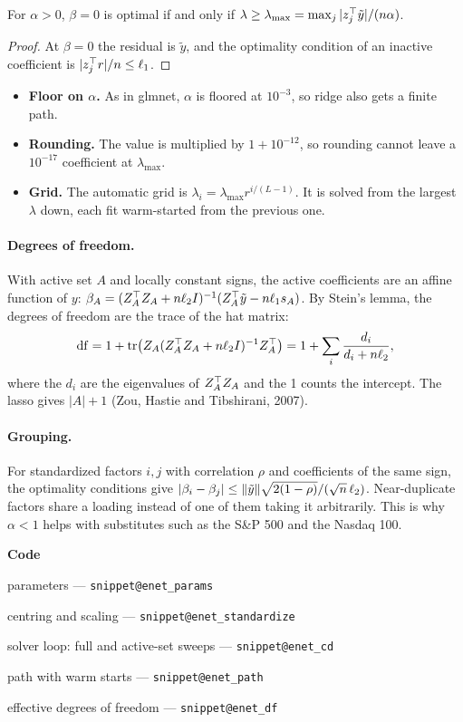 \documentclass[11pt,a4paper]{article}
\makeatletter
\newcommand{\snippetsource}[1]{\csname snippet@#1\endcsname}
\newcommand{\snippet}[3]{%
  }
\newenvironment{codepointers}{%
  \par\smallskip\begingroup\footnotesize\noindent\textcolor{blue!50!black}{\textbf{Code}}\par\nopagebreak
  \begin{list}{}{\setlength{\leftmargin}{1.2em}\setlength{\itemsep}{0pt}\setlength{\parsep}{0pt}\setlength{\topsep}{1pt}}}%
  {\end{list}\endgroup\smallskip}
\newcommand{\codeitem}[2]{\item #2 --- \texttt{\snippetsource{#1}}}
\makeatother
\begin{document}
\begin{proposition}[$\lambda_{\max}$]
For $\alpha>0$, $\beta=0$ is optimal if and only if
$\lambda\ge\lambda_{\max}=\max_j|z_j^\top\tilde y|/(n\alpha)$.
\end{proposition}
\begin{proof}
At $\beta=0$ the residual is $\tilde y$, and the optimality condition of an inactive
coefficient is $|z_j^\top r|/n\le\ell_1$.
\end{proof}
\begin{itemize}
  \item \textbf{Floor on $\alpha$.} As in glmnet, $\alpha$ is floored at $10^{-3}$, so ridge
        also gets a finite path.
  \item \textbf{Rounding.} The value is multiplied by $1+10^{-12}$, so rounding cannot
        leave a $10^{-17}$ coefficient at $\lambda_{\max}$.
  \item \textbf{Grid.} The automatic grid is $\lambda_i=\lambda_{\max}r^{i/(L-1)}$. It is
        solved from the largest $\lambda$ down, each fit warm-started from the previous
        one.
\end{itemize}

\paragraph{Degrees of freedom.} With active set $A$ and locally constant signs, the active
coefficients are an affine function of $y$:
$\beta_A=(Z_A^\top Z_A+n\ell_2I)^{-1}(Z_A^\top\tilde y-n\ell_1s_A)$. By Stein's lemma, the degrees of
freedom are the trace of the hat matrix:
\[
  \mathrm{df}=1+\operatorname{tr}\!\big(Z_A(Z_A^\top Z_A+n\ell_2I)^{-1}Z_A^\top\big)=1+\sum_i\frac{d_i}{d_i+n\ell_2},
\]
where the $d_i$ are the eigenvalues of $Z_A^\top Z_A$ and the 1 counts the intercept. The
lasso gives $|A|+1$ (Zou, Hastie and Tibshirani, 2007).

\paragraph{Grouping.} For standardized factors $i,j$ with correlation $\rho$ and coefficients
of the same sign, the optimality conditions give
$|\beta_i-\beta_j|\le\lVert \tilde y\rVert\sqrt{2(1-\rho)}/(\sqrt n\,\ell_2)$. Near-duplicate factors
share a loading instead of one of them taking it arbitrarily. This is why $\alpha<1$ helps
with substitutes such as the S\&P 500 and the Nasdaq 100.
\snippet{enet_sweep}{C++}{One coordinate descent sweep}
\snippet{enet_lambda_max}{C++}{$\lambda_{\max}$ with the same arithmetic as the first update}
\begin{codepointers}
  \codeitem{enet_params}{parameters}
  \codeitem{enet_standardize}{centring and scaling}
  \codeitem{enet_cd}{solver loop: full and active-set sweeps}
  \codeitem{enet_path}{path with warm starts}
  \codeitem{enet_df}{effective degrees of freedom}
\end{codepointers}
\end{document}
